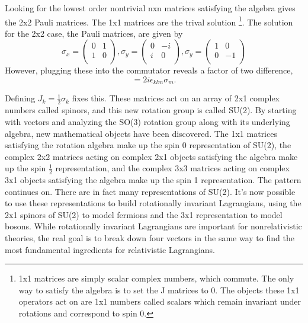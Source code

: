 \documentclass[12pt]{article}
\begin{document}
Looking for the lowest order nontrivial nxn matrices satisfying the algebra gives the 2x2 Pauli matrices. The 1x1 matrices are the trival solution \footnote{1x1 matrices are simply scalar complex numbers, which commute. The only way to satisfy the algebra is to set the J matrices to 0. The objects these 1x1 operators act on are 1x1 numbers called scalars which remain invariant under rotations and correspond to spin 0.}. The solution for the 2x2 case, the Pauli matrices, are given by
\begin{equation}
\sigma_x = 
\begin{pmatrix}
0 & 1 \\
1 & 0 \\
\end{pmatrix},
\sigma_y = 
\begin{pmatrix}
0 & -i \\
i & 0 \\
\end{pmatrix},
\sigma_y = 
\begin{pmatrix}
1 & 0 \\
0 & -1 \\
\end{pmatrix}
\end{equation}
However, plugging these into the commutator reveals a factor of two difference,
\begin{equation}
[\sigma_k, \sigma_l] = 2i\epsilon_{klm}\sigma_m.
\end{equation}

Defining $J_k = \frac{1}{2} \sigma_k$ fixes this. These matrices act on an array of 2x1 complex numbers called spinors, and this new rotation group is called SU(2). By starting with vectors and analyzing the SO(3) rotation group along with its underlying algebra, new mathematical objects have been discovered. The 1x1 matrices satisfying the rotation algebra make up the spin 0 representation of SU(2), the complex 2x2 matrices acting on complex 2x1 objects satisfying the algebra make up the spin $\frac{1}{2}$ representation, and the complex 3x3 matrices acting on complex 3x1 objects satisfying the algebra make up the spin 1 representation. The pattern continues on. There are in fact many representations of SU(2). It's now possible to use these representations to build rotationally invariant Lagrangians, using the 2x1 spinors of SU(2) to model fermions and the 3x1 representation to model bosons. While rotationally invariant Lagrangians are important for nonrelativistic theories, the real goal is to break down four vectors in the same way to find the most fundamental ingredients for relativistic Lagrangians. 
\end{document}
